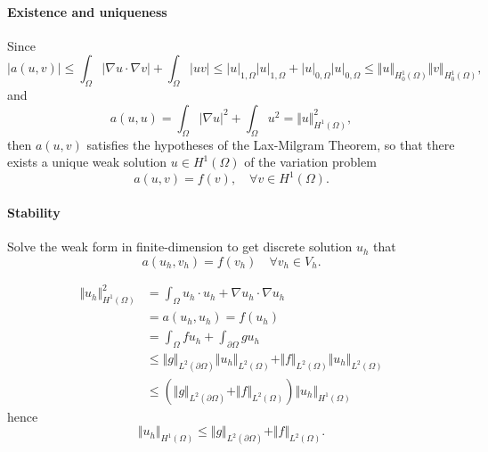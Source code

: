\documentclass[11pt,letterpaper]{article}
\begin{document}
\paragraph{Existence and uniqueness}
Since
\begin{displaymath}
  |a(u,v)|\leq \int_{\Omega} |\nabla u\cdot \nabla v|+\int_\Omega |uv|
  \leq |u|_{1,\Omega}|u|_{1,\Omega}+|u|_{0,\Omega}|u|_{0,\Omega}
  \leq \Vert u\Vert_{H^1_0(\Omega)}\Vert v\Vert_{H^1_0(\Omega)},
\end{displaymath}
and
\begin{displaymath}
  a(u,u)=\int_{\Omega} |\nabla u|^2+\int_\Omega u^2=\Vert u\Vert_{H^1(\Omega)}^2,
\end{displaymath}
then $a(u,v)$ satisfies the hypotheses of the Lax-Milgram Theorem,
so that there exists a unique weak solution $u\in H^1(\Omega)$ of the variation problem
\begin{displaymath}
  a(u,v)=f(v),\quad \forall v\in H^1(\Omega).
\end{displaymath}

\paragraph{Stability}

Solve the weak form in finite-dimension to get discrete solution $u_h$ that
\begin{displaymath}
  a(u_h,v_h)=f(v_h)\quad \forall v_h\in V_h.
\end{displaymath}

\begin{displaymath}
  \begin{aligned}
    \Vert u_h\Vert_{H^1(\Omega)}^2
    &= \int_\Omega u_h\cdot u_h+\nabla u_h\cdot \nabla u_h\\
                                &=a(u_h,u_h)=f(u_h)\\
    &=\int_\Omega fu_h +\int_{\partial \Omega} gu_h\\
    &\leq \Vert g\Vert_{L^2(\partial \Omega)}\Vert u_h\Vert_{L^2(\Omega)}
      +\Vert f\Vert_{L^2(\Omega)}\Vert u_h\Vert_{L^2(\Omega)}\\
    &\leq ( \Vert g\Vert_{L^2(\partial \Omega)}+\Vert f\Vert_{L^2(\Omega)})
      \Vert u_h\Vert_{H^1(\Omega)}
  \end{aligned}
\end{displaymath}
hence
\begin{displaymath}
   \Vert u_h\Vert_{H^1(\Omega)}\leq  \Vert g\Vert_{L^2(\partial \Omega)}+\Vert f\Vert_{L^2(\Omega)}.
 \end{displaymath}
\end{document}
